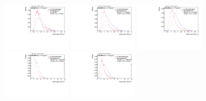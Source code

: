 \begin{figure}[H]
\bigskip
\includegraphics[width=0.3\textwidth]{sascha_input/Appendix/Distributions/higgs/distributions/beta1/h_recoJet_D2_bin1.pdf} \hspace{1mm}
\includegraphics[width=0.3\textwidth]{sascha_input/Appendix/Distributions/higgs/distributions/beta1/h_recoJet_D2_bin2.pdf} \hspace{4mm}
\includegraphics[width=0.3\textwidth]{sascha_input/Appendix/Distributions/higgs/distributions/beta1/h_recoJet_D2_bin3.pdf} 
\bigskip
\includegraphics[width=0.3\textwidth]{sascha_input/Appendix/Distributions/higgs/distributions/beta1/h_recoJet_D2_bin4.pdf} \hspace{4mm}
\includegraphics[width=0.3\textwidth]{sascha_input/Appendix/Distributions/higgs/distributions/beta1/h_recoJet_D2_bin5.pdf} 


\end{figure}
